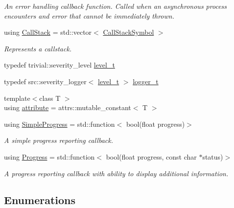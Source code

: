 \begin{DoxyCompactItemize}
\begin{DoxyCompactList}\small\item\em An error handling callback function. Called when an asynchronous process encounters and error that cannot be immediately thrown. \end{DoxyCompactList}\item 
using \hyperlink{group___utility_module_gabdf2d70ae3aab3c57142eddec69a725c}{Call\+Stack} = std\+::vector$<$ \hyperlink{structdg_1_1deepcore_1_1_call_stack_symbol}{Call\+Stack\+Symbol} $>$
\begin{DoxyCompactList}\small\item\em Represents a callstack. \end{DoxyCompactList}\item 
typedef trivial\+::severity\+\_\+level \hyperlink{namespacedg_1_1deepcore_ac108b40b3a6b8e3450281eb787e27d6b}{level\+\_\+t}
\item 
typedef src\+::severity\+\_\+logger$<$ \hyperlink{namespacedg_1_1deepcore_ac108b40b3a6b8e3450281eb787e27d6b}{level\+\_\+t} $>$ \hyperlink{namespacedg_1_1deepcore_acaeda2fb8a475fd1de2ef14ac9ec7a2f}{logger\+\_\+t}
\item 
{\footnotesize template$<$class T $>$ }\\using \hyperlink{namespacedg_1_1deepcore_abfee748fb46325389237ecd4d1d7f21b}{attribute} = attrs\+::mutable\+\_\+constant$<$ T $>$
\item 
using \hyperlink{group___utility_module_ga6763018df79e4bdbcd8cd14cea5342b2}{Simple\+Progress} = std\+::function$<$ bool(float progress)$>$
\begin{DoxyCompactList}\small\item\em A simple progress reporting callback. \end{DoxyCompactList}\item 
using \hyperlink{group___utility_module_gae07fce8a40a5222a0dcd537a0b28a008}{Progress} = std\+::function$<$ bool(float progress, const char $\ast$status)$>$
\begin{DoxyCompactList}\small\item\em A progress reporting callback with ability to display additional information. \end{DoxyCompactList}\end{DoxyCompactItemize}
\subsection*{Enumerations}
